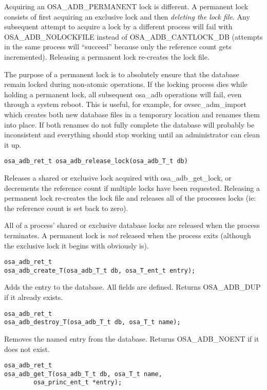Acquiring an OSA_ADB_PERMANENT lock is different.  A permanent lock
consists of first acquiring an exclusive lock and then {\it deleting
the lock file}.  Any subsequent attempt to acquire a lock by a
different process will fail with OSA_ADB_NOLOCKFILE instead of
OSA_ADB_CANTLOCK_DB (attempts in the same process will ``succeed''
because only the reference count gets incremented).  Releasing a
permanent lock re-creates the lock file.

The purpose of a permanent lock is to absolutely ensure that the
database remain locked during non-atomic operations.  If the locking
process dies while holding a permanent lock, all subsequent osa_adb
operations will fail, even through a system reboot.  This is useful,
for example, for ovsec_adm_import which creates both new database
files in a temporary location and renames them into place.  If both
renames do not fully complete the database will probably be
inconsistent and everything should stop working until an administrator
can clean it up.

\begin{verbatim}
osa_adb_ret_t osa_adb_release_lock(osa_adb_T_t db)
\end{verbatim}

Releases a shared or exclusive lock acquired with osa_adb_get_lock, or
decrements the reference count if multiple locks have been requested.
Releasing a permanent lock re-creates the lock file and releases all
of the processes locks (ie: the reference count is set back to zero).

All of a process' shared or exclusive database locks are released when
the process terminates.  A permanent lock is {\it not} released when
the process exits (although the exclusive lock it begins with
obviously is).

\begin{verbatim}
osa_adb_ret_t
osa_adb_create_T(osa_adb_T_t db, osa_T_ent_t entry);
\end{verbatim}
%
Adds the entry to the database.  All fields are defined.  Returns
OSA_ADB_DUP if it already exists.

\begin{verbatim}
osa_adb_ret_t
osa_adb_destroy_T(osa_adb_T_t db, osa_T_t name);
\end{verbatim}

Removes the named entry from the database.  Returns OSA_ADB_NOENT if
it does not exist.

\begin{verbatim}
osa_adb_ret_t
osa_adb_get_T(osa_adb_T_t db, osa_T_t name,
        osa_princ_ent_t *entry); 
\end{verbatim}

